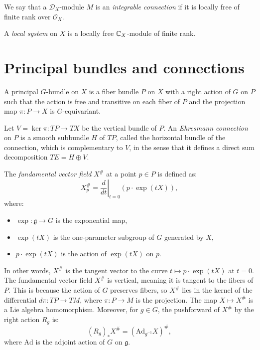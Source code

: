 \documentclass[12pt]{article}
\begin{document}
\begin{definition}
	We say that a \( \mathcal{D}_X \)-module \( M \) is an \emph{integrable connection} if it is locally free of finite rank over \( \mathcal{O}_X \).
\end{definition}

\begin{definition}
	A \emph{local system} on \( X \) is a locally free $\mathbb{C}_X$-module of finite rank.
\end{definition}

\section{Principal bundles and connections}

\begin{definition}
	A principal \( G \)-bundle on \( X \) is a fiber bundle \( P \) on \( X \) with a right action of \( G \) on \( P \) such that the action is free and transitive on each fiber of \( P \) and the projection map \( \pi : P \rightarrow X \) is \( G \)-equivariant.
\end{definition}

\begin{definition}
	Let $V = \ker{\pi: TP \to TX}$ be the vertical bundle of $P$. An \emph{Ehresmann connection} on \( P \) is a smooth subbundle \( H \) of \( TP \), called the horizontal bundle of the connection, which is complementary to \( V \), in the sense that it defines a direct sum decomposition \( TE = H \oplus V \).
\end{definition}

The \emph{fundamental vector field} \( X^\# \) at a point \( p \in P \) is defined as:
\[
	X^\#_p = \left. \frac{d}{dt} \right|_{t=0} (p \cdot \exp(tX)),
\]
where:
\begin{itemize}
	\item \( \exp: \mathfrak{g} \to G \) is the exponential map,
	\item \( \exp(tX) \) is the one-parameter subgroup of \( G \) generated by \( X \),
	\item \( p \cdot \exp(tX) \) is the action of \( \exp(tX) \) on \( p \).
\end{itemize}

In other words, \( X^\# \) is the tangent vector to the curve \( t \mapsto p \cdot \exp(tX) \) at \( t = 0 \). The fundamental vector field \( X^\# \) is vertical, meaning it is tangent to the fibers of \( P \). This is because the action of \( G \) preserves fibers, so \( X^\# \) lies in the kernel of the differential \( d\pi: TP \to TM \), where \( \pi: P \to M \) is the projection.  The map \( X \mapsto X^\# \) is a Lie algebra homomorphism. Moreover, for \( g \in G \), the pushforward of \( X^\# \) by the right action \( R_g \) is:
\[
	(R_g)_* X^\# = (\text{Ad}_{g^{-1}} X)^\#,
\]
where \( \text{Ad} \) is the adjoint action of \( G \) on \( \mathfrak{g} \).
\end{document}
